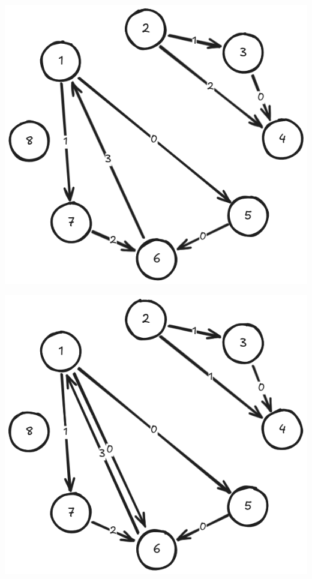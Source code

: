 \documentclass[12pt, a4paper]{article}
\begin{document}
\vspace{5mm}
\begin{multicols}{2}
  \begin{flushright}
    \includegraphics[scale=0.3]{./img/1.png}
  \end{flushright}
\columnbreak
  \begin{flushleft}
    \includegraphics[scale=0.3]{./img/2.png}
  \end{flushleft}
\end{multicols}
\vspace{5mm}
\end{document}
